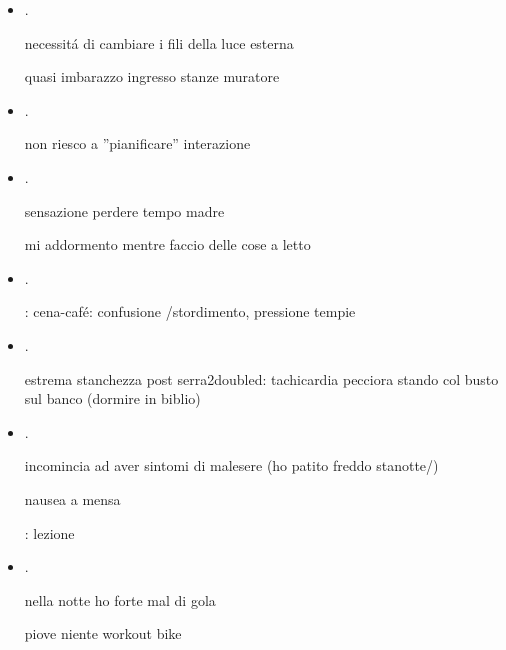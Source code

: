 \begin{itemize}
\item {}.



necessit\'a di cambiare i fili della luce esterna

quasi imbarazzo ingresso stanze muratore


\item {}.

non riesco a ''pianificare'' interazione 

\item {}.

sensazione perdere tempo madre


mi addormento mentre faccio delle cose a letto

\item {}.

: cena-caf\'e: confusione /stordimento, pressione tempie

\item {}.

estrema stanchezza post serra2doubled: tachicardia pecciora stando col busto sul banco (dormire in biblio)


\item {}.

incomincia ad aver sintomi di malesere (ho patito freddo stanotte/)

nausea a mensa

: lezione



\item {}.

nella notte ho forte mal di gola

piove niente workout bike


\end{itemize}
